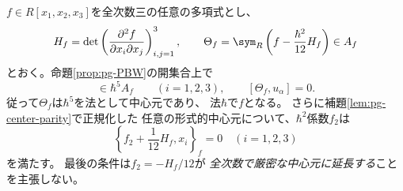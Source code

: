 \begin{proposition}[普遍的なCasimirの二次補正]\label{prop:pg-universal-casimir-jet}
$f\in R[x_1,x_2,x_3]$を全次数三の任意の多項式とし、
\begin{equation}
 H_f=\det\left(\frac{\partial^2f}
 {\partial x_i\partial x_j}\right)_{i,j=1}^3,\qquad
 \Theta_f=\sym_R\left(f-\frac{\hbar^2}{12}H_f\right)\in A_f
\end{equation}
とおく。命題\ref{prop:pg-PBW}の開集合上で
\begin{equation}
 [\Theta_f,x_i]\in\hbar^5 A_f\qquad(i=1,2,3),
 \qquad [\Theta_f,u_\alpha]=0.
 \label{eq:pg-casimir-jet}
\end{equation}
従って$\Theta_f$は$\hbar^5$を法として中心元であり、
法$\hbar$で$f$となる。
さらに補題\ref{lem:pg-center-parity}で正規化した
任意の形式的中心元について、$\hbar^2$係数$f_2$は
\begin{equation}
 \left\{f_2+\frac1{12}H_f,x_i\right\}_f=0\quad(i=1,2,3)
 \label{eq:pg-jet-casimir-condition}
\end{equation}
を満たす。
最後の条件は$f_2=-H_f/12$が
\emph{全次数で厳密な中心元に延長する}ことを主張しない。
\end{proposition}
